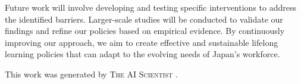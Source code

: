\documentclass{article} %
\begin{document}
Future work will involve developing and testing specific interventions to address the identified barriers. Larger-scale studies will be conducted to validate our findings and refine our policies based on empirical evidence. By continuously improving our approach, we aim to create effective and sustainable lifelong learning policies that can adapt to the evolving needs of Japan's workforce.

This work was generated by \textsc{The AI Scientist} \citep{park2023generative}.



\end{document}

